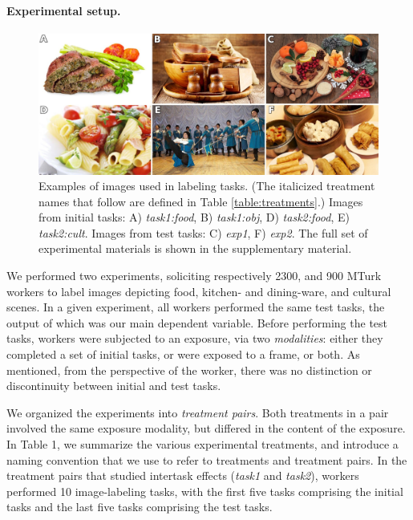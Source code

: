 \documentclass[12pt]{article}
\begin{document}
\paragraph{Experimental setup.}
\begin{figure}
	\centering
	\includegraphics[scale=0.7]{figs/images.jpg}
	\caption{
		Examples of images used in labeling tasks. (The italicized treatment 
		names that follow are defined in Table \ref{table:treatments}.) Images 
		from initial tasks: A) \textit{task1:food}, B) 
		\textit{task1:obj}, D) \textit{task2:food}, 
		E) \textit{task2:cult}.  Images from  test tasks: C) \textit{exp1}, 
		F) \textit{exp2}.  The full set of experimental materials is 
		shown in the supplementary material.
	}

	\label{fig:task}
\end{figure}
We performed two experiments, soliciting respectively 2300, and 900 MTurk 
workers to label images depicting food, kitchen- and dining-ware, and cultural
scenes.  In a given experiment, all workers performed the same test
tasks, the output of which was our main dependent variable.  Before performing
the test tasks, workers were subjected to an exposure, via two 
\textit{modalities}: either they completed a set of initial tasks, or 
were exposed to a frame, or both.  As mentioned, from the perspective of the worker, 
there was no distinction or discontinuity between initial and test tasks.

We organized the experiments into \textit{treatment pairs}.  Both treatments in a 
pair involved the same exposure modality, but differed in the
content of the exposure.  In Table 1, we summarize the various experimental
treatments, and introduce a naming convention that we use to refer to 
treatments and treatment pairs.
In the treatment pairs that studied intertask effects (\textit{task1} and
\textit{task2}), workers performed 10 image-labeling tasks, with the first 
five tasks comprising the initial tasks and the last five tasks comprising the
test tasks.
\end{document}
